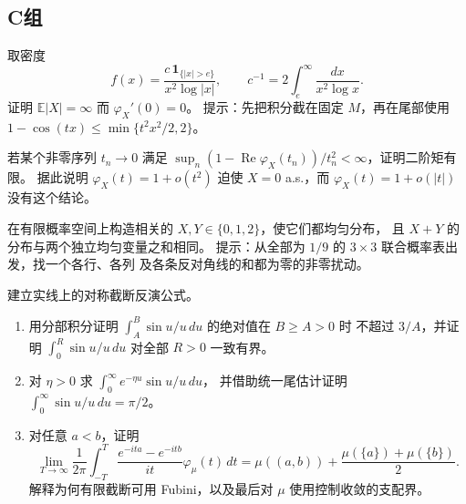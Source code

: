 \subsection*{C组}
\begin{enumerate}[label=\textbf{\thechapter.\arabic*.},resume]
取密度
\[
 f(x)=\frac{c\,\mathbf1_{\{|x|>e\}}}{x^2\log|x|},
 \qquad c^{-1}=2\int_e^\infty\frac{dx}{x^2\log x}.
\]
证明 $\mathbb E|X|=\infty$ 而 $\varphi_X'(0)=0$。
提示：先把积分截在固定 $M$，再在尾部使用
$1-\cos(tx)\le\min\{t^2x^2/2,2\}$。

若某个非零序列 $t_n\to0$ 满足
$\sup_n(1-\operatorname{Re}\varphi_X(t_n))/t_n^2<\infty$，证明二阶矩有限。
据此说明 $\varphi_X(t)=1+o(t^2)$ 迫使 $X=0$ a.s.，而
$\varphi_X(t)=1+o(|t|)$ 没有这个结论。

在有限概率空间上构造相关的 $X,Y\in\{0,1,2\}$，使它们都均匀分布，
且 $X+Y$ 的分布与两个独立均匀变量之和相同。
提示：从全部为 $1/9$ 的 $3\times3$ 联合概率表出发，找一个各行、各列
及各条反对角线的和都为零的非零扰动。

建立实线上的对称截断反演公式。
\begin{enumerate}[label=\textup{(\roman*)}]
\item 用分部积分证明 $\int_A^B\sin u/u\,du$ 的绝对值在 $B\ge A>0$ 时
不超过 $3/A$，并证明 $\int_0^R\sin u/u\,du$ 对全部 $R>0$ 一致有界。
\item 对 $\eta>0$ 求 $\int_0^\infty e^{-\eta u}\sin u/u\,du$，
并借助统一尾估计证明 $\int_0^\infty\sin u/u\,du=\pi/2$。
\item 对任意 $a<b$，证明
\[
 \lim_{T\to\infty}\frac1{2\pi}\int_{-T}^{T}
 \frac{e^{-ita}-e^{-itb}}{it}\varphi_\mu(t)\,dt
 =\mu((a,b))+\frac{\mu(\{a\})+\mu(\{b\})}{2}.
\]
解释为何有限截断可用 Fubini，以及最后对 $\mu$ 使用控制收敛的支配界。
\end{enumerate}
\end{enumerate}
